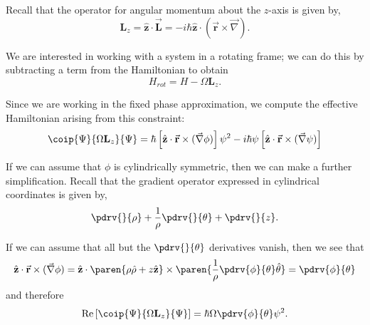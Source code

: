 \documentclass[onecolumn,,amsmath,amssymb,nofootinbib,floatfix]{revtex4}
\begin{document}
Recall that the operator for angular momentum about the $z$-axis is given by,
$$\textbf{L}_z = \hat{\textbf{z}}\cdot \vec{\textbf{L}} = -i\hbar\hat{\textbf{z}}\cdot (\vec{\textbf{r}}\times\vec{\nabla}).$$

We are interested in working with a system in a rotating frame;  we can do this by subtracting a term from the Hamiltonian to obtain
$$H_{rot} = H - \Omega \textbf{L}_z.$$

Since we are working in the fixed phase approximation, we compute the effective Hamiltonian arising from this constraint:
$$\coip{\Psi}{\Omega \textbf{L}_z}{\Psi} = \hbar\left[\hat{\textbf{z}}\cdot\vec{\textbf{r}}\times(\vec{\nabla}\phi)\right]\psi^2-i\hbar\psi\left[\hat{\textbf{z}}\cdot\vec{\textbf{r}}\times(\vec{\nabla}\psi)\right]$$

If we can assume that $\phi$ is cylindrically symmetric, then we can make a further simplification.  Recall that the gradient operator expressed in cylindrical coordinates is given by,
$$\pdrv{}{\rho} + \frac{1}{\rho}\pdrv{}{\theta} + \pdrv{}{z}.$$

If we can assume that all but the $\pdrv{}{\theta}$ derivatives vanish, then we see that
$$
\begin{aligned}
\hat{\textbf{z}}\cdot\vec{\textbf{r}}\times(\vec{\nabla}\phi)
= \hat{\textbf{z}}\cdot\paren{\rho \hat{\rho} + z\hat{\textbf{z}}}\times\paren{\frac{1}{\rho}\pdrv{\phi}{\theta}\hat\theta}
= \pdrv{\phi}{\theta}\\ 
\end{aligned}
$$
and therefore
$$\text{Re}\left[\coip{\Psi}{\Omega \textbf{L}_z}{\Psi}\right] = \hbar \Omega\pdrv{\phi}{\theta}\psi^2.$$
\end{document}
